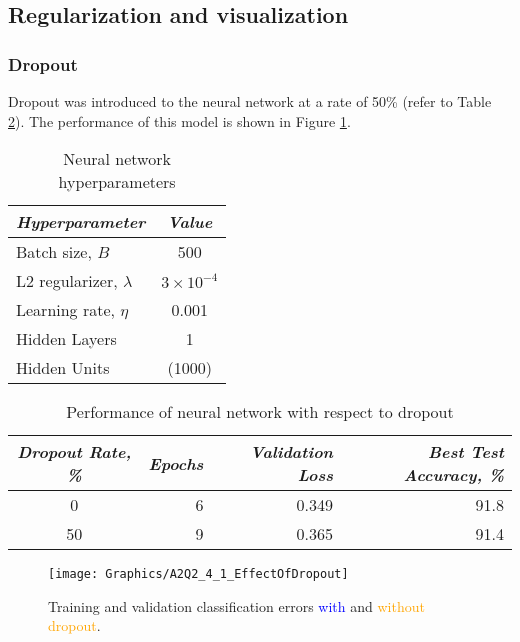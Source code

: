 \documentclass[a4paper,12pt]{article}
\begin{document}
\clearpage
\subsection{Regularization and visualization}
\subsubsection{Dropout}
Dropout was introduced to the neural network at a rate of 50\% (refer to Table \ref{table:NN_Dropout}). The performance of this model is shown in Figure \ref{figure:NN_EffectOfDropout}.

\begin{table}[!htb]
\centering
\caption{Neural network hyperparameters}
\label{table:NN_HParam_2_4_1}
\vspace{0.5em}
\begin{tabular}{|l|c|} \hline
\textit{Hyperparameter} & \textit{Value} \\ \hline
Batch size, $B$ & 500 \\
L2 regularizer, $\lambda$ & $3 \times 10^{-4}$  \\
Learning rate, $\eta$ & 0.001 \\
Hidden Layers & 1 \\
Hidden Units & (1000) \\
\hline
\end{tabular}
\end{table}

\begin{table}[!htb]
\centering
\caption{Performance of neural network with respect to dropout}
\label{table:NN_Dropout}
\vspace{0.5em}
\begin{tabular}{|c|r r r|} \hline
\textit{Dropout Rate, \%} & \textit{Epochs} & \textit{Validation Loss} & \textit{Best Test Accuracy, \%} \\ \hline
0 & 6 & 0.349 & 91.8 \\
50 & 9 & 0.365 & 91.4 \\
\hline
\end{tabular}
\end{table}

\begin{figure}[!htb]
\centering
\texttt{[image: Graphics/A2Q2\_4\_1\_EffectOfDropout]}
\caption{\label{figure:NN_EffectOfDropout} Training and validation classification errors \textcolor{blue}{with} and \textcolor{orange}{without dropout}.}
\end{figure}
\end{document}
